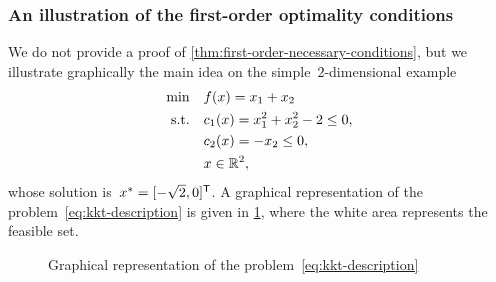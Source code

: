 \subsubsection{An illustration of the first-order optimality conditions}

We do not provide a proof of \cref{thm:first-order-necessary-conditions}, but we illustrate graphically the main idea on the simple~$2$-dimensional example
\begin{subequations}
    \label{eq:kkt-description}
    \begin{align}
        \min        & \quad f(x) = x_1 + x_2\\
        \text{s.t.} & \quad c_{1}(x) = x_1^2 + x_2^2 - 2 \le 0, \label{eq:kkt-description-c1}\\
                    & \quad c_{2}(x) = -x_2 \le 0, \label{eq:kkt-description-c2}\\
                    & \quad x \in \mathbb{R}^2, \nonumber
    \end{align}
\end{subequations}
whose solution is~$x^{\ast} = [-\sqrt{2}, 0]^{\mathsf{T}}$.
A graphical representation of the problem~\cref{eq:kkt-description} is given in \cref{fig:kkt-description}, where the white area represents the feasible set.

\begin{figure}[ht]
    \centering
    \caption{Graphical representation of the problem~\cref{eq:kkt-description}}
    \label{fig:kkt-description}
\end{figure}

